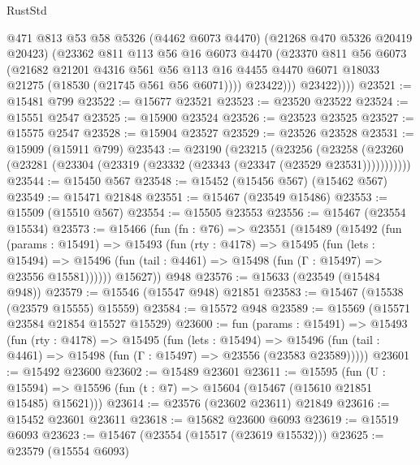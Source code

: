 \begin{lexlean}{RustStd}
\begin{coremodule}
                @471
                @813
                @53
                @58
                @5326
                (@4462 @6073 @4470)
                (@21268 @470 @5326 @20419 @20423)
                (@23362
                  @811
                  @113
                  @56
                  @16
                  @6073
                  @4470
                  (@23370
                    @811
                    @56
                    @6073
                    (@21682
                      @21201
                      @4316
                      @561
                      @56
                      @113
                      @16
                      @4455
                      @4470
                      @6071
                      @18033
                      @21275
                      (@18530 (@21745 @561 @56 @6071))))
                  @23422)))
            @23422))))
@23521 := @15481 @799
@23522 := @15677 @23521
@23523 := @23520 @23522
@23524 := @15551 @2547
@23525 := @15900 @23524
@23526 := @23523 @23525
@23527 := @15575 @2547
@23528 := @15904 @23527
@23529 := @23526 @23528
@23531 := @15909 (@15911 @799)
@23543 := @23190
    (@23215
      (@23256
        (@23258 (@23260 (@23281 (@23304 (@23319 (@23332 (@23343 (@23347 (@23529 @23531)))))))))))
@23544 := @15450 @567
@23548 := @15452 (@15456 @567) (@15462 @567)
@23549 := @15471 @21848
@23551 := @15467 (@23549 @15486)
@23553 := @15509 (@15510 @567)
@23554 := @15505 @23553
@23556 := @15467 (@23554 @15534)
@23573 := @15466
    (fun (fn : @76) =>
    @23551
      (@15489
        (@15492
          (fun (params : @15491) =>
          @15493
            (fun (rty : @4178) =>
            @15495
              (fun (lets : @15494) =>
              @15496 (fun (tail : @4461) => @15498 (fun (Γ : @15497) => @23556 @15581))))))
        @15627))
    @948
@23576 := @15633 (@23549 (@15484 @948))
@23579 := @15546 (@15547 @948) @21851
@23583 := @15467 (@15538 (@23579 @15555) @15559)
@23584 := @15572 @948
@23589 := @15569 (@15571 @23584 @21854 @15527 @15529)
@23600 := fun (params : @15491) =>
  @15493
    (fun (rty : @4178) =>
    @15495
      (fun (lets : @15494) =>
      @15496 (fun (tail : @4461) => @15498 (fun (Γ : @15497) => @23556 (@23583 @23589)))))
@23601 := @15492 @23600
@23602 := @15489 @23601
@23611 := @15595
    (fun (U : @15594) => @15596 (fun (t : @7) => @15604 (@15467 (@15610 @21851 @15485) @15621)))
@23614 := @23576 (@23602 @23611) @21849
@23616 := @15452 @23601 @23611
@23618 := @15682 @23600 @6093
@23619 := @15519 @6093
@23623 := @15467 (@23554 (@15517 (@23619 @15532)))
@23625 := @23579 (@15554 @6093)

\end{coremodule}
\end{lexlean}
